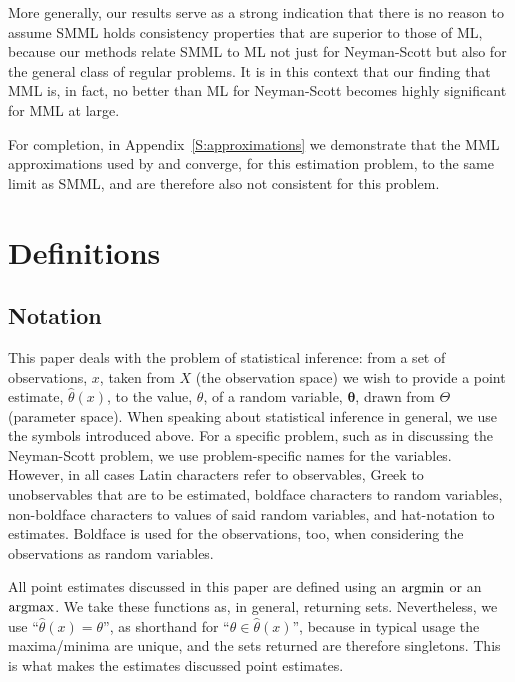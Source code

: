 \documentclass{IEEEtran}
\newcommand{\citet}[1]{\cite{#1}}
\newcommand{\argmax}{\operatornamewithlimits{argmax}}
\newcommand{\argmin}{\operatornamewithlimits{argmin}}
\begin{document}
More generally, our results serve as a strong indication that there is no
reason to
assume SMML holds consistency properties that are superior to those of ML,
because our methods relate SMML to ML not just for Neyman-Scott but also for the
general class of regular problems.
It is in this context that our finding that MML is, in fact,
no better than ML for Neyman-Scott becomes highly significant for
MML at large.

For completion, in Appendix~\ref{S:approximations}
we demonstrate that the MML approximations
used by \citet{dowe1997resolving} and \citet{Wallace2005} converge, for this
estimation problem, to the same limit as SMML, and are therefore also
not consistent for this problem.

\section{Definitions}\label{S:definitions}

\subsection{Notation}\label{SS:notations}

This paper deals with the problem of statistical inference: from a set of
observations, $x$, taken from $X$ (the observation space)
we wish to provide a point estimate,
$\hat{\theta}(x)$, to the value, $\theta$, of a random variable,
$\boldsymbol{\theta}$, drawn from $\Theta$ (parameter
space). When speaking about statistical inference in general, we
use the symbols introduced above. For a specific problem, such as in discussing
the Neyman-Scott problem, we use problem-specific names for the variables.
However, in all cases Latin characters refer to observables, Greek to
unobservables that are to be estimated, boldface characters to random variables,
non-boldface characters to values of said random variables, and hat-notation
to estimates. Boldface is used for the observations, too, when
considering the observations as random variables.

All point estimates discussed in this paper
are defined using an $\argmin$ or an $\argmax$. We take these functions
as, in general, returning sets. Nevertheless, we use
``$\hat{\theta}(x)=\theta$'',
as shorthand for
``$\theta\in\hat{\theta}(x)$'', because in typical usage the maxima/minima
are unique, and the sets returned are therefore singletons. This is what
makes the estimates discussed point estimates.
\end{document}
